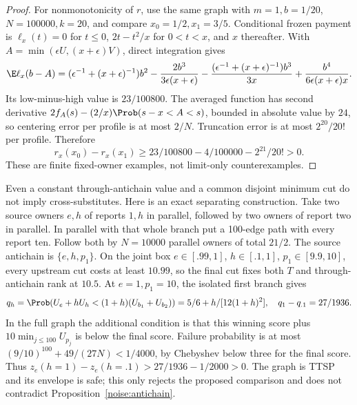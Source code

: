 \begin{proof}
For nonmonotonicity of $r$, use the same graph with $m=1,b=1/20$,
$N=100000,k=20$, and compare $x_0=1/2,x_1=3/5$.
Conditional frozen payment is
$\ell_x(t)=0$ for $t\le0$, $2t-t^2/x$ for $0<t<x$, and $x$ thereafter.
With $A=\min(\epsilon U,(x+\epsilon)V)$, direct integration gives
\[
 \E\ell_x(b-A)=(\epsilon^{-1}+(x+\epsilon)^{-1})b^2
 -\frac{2b^3}{3\epsilon(x+\epsilon)}
 -\frac{(\epsilon^{-1}+(x+\epsilon)^{-1})b^3}{3x}
 +\frac{b^4}{6\epsilon(x+\epsilon)x}.
\]
Its low-minus-high value is $23/100800$. The averaged function has
second derivative $2f_A(s)-(2/x)\Prob(s-x<A<s)$, bounded in absolute value
by $24$, so centering error per profile is at most $2/N$.
Truncation error is at most $2^{20}/20!$ per profile. Therefore
\[
 r_x(x_0)-r_x(x_1)\ge23/100800-4/100000-2^{21}/20!>0.
\]
These are finite fixed-owner examples, not limit-only counterexamples.
\end{proof}

Even a constant through-antichain value and a common disjoint minimum cut
do not imply cross-substitutes. Here is an exact separating construction.
Take two source owners $e,h$ of reports $1,h$ in parallel, followed by two
owners of report two in parallel. In parallel with that whole branch put a
100-edge path with every report ten. Follow both by $N=10000$ parallel
owners of total $21/2$. The source antichain is $\{e,h,p_1\}$.
On the joint box $e\in[.99,1]$, $h\in[.1,1]$, $p_1\in[9.9,10]$,
every upstream cut costs at least $10.99$, so the final cut fixes both
$T$ and through-antichain rank at $10.5$.
At $e=1,p_1=10$, the isolated first branch gives
\[
 q_h=\Prob(U_e+hU_h<(1+h)(U_{b_1}+U_{b_2}))
     =5/6+h/[12(1+h)^2],\quad q_1-q_{.1}=27/1936.
\]
In the full graph the additional condition is that this winning score plus
$10\min_{j\le100}U_{p_j}$ is below the final score. Failure probability
is at most $(9/10)^{100}+49/(27N)<1/4000$, by Chebyshev below three for
the final score. Thus $z_e(h=1)-z_e(h=.1)>27/1936-1/2000>0$.
The graph is TTSP and its envelope is safe; this only rejects the proposed
comparison and does not contradict Proposition~\ref{noise:antichain}.

